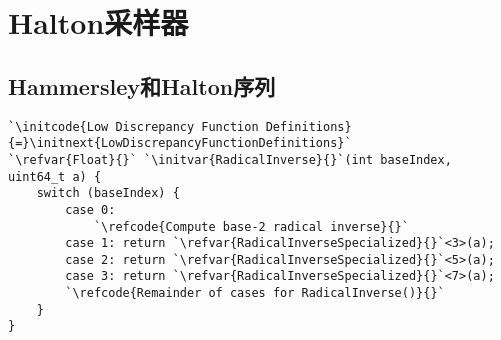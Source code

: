 \section{Halton采样器}\label{sec:Halton采样器}

\subsection{Hammersley和Halton序列}\label{sub:Hammersley和Halton序列}
\begin{lstlisting}
`\initcode{Low Discrepancy Function Definitions}{=}\initnext{LowDiscrepancyFunctionDefinitions}`
`\refvar{Float}{}` `\initvar{RadicalInverse}{}`(int baseIndex, uint64_t a) {
    switch (baseIndex) {
        case 0:
            `\refcode{Compute base-2 radical inverse}{}`
        case 1: return `\refvar{RadicalInverseSpecialized}{}`<3>(a);
        case 2: return `\refvar{RadicalInverseSpecialized}{}`<5>(a);
        case 3: return `\refvar{RadicalInverseSpecialized}{}`<7>(a);
        `\refcode{Remainder of cases for RadicalInverse()}{}`
    }
}
\end{lstlisting}